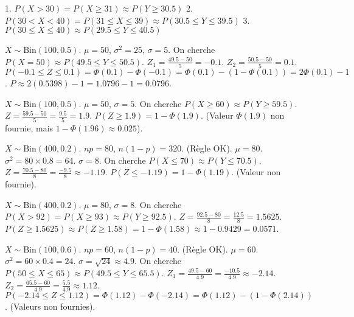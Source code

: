\begin{correctionbox}
1. $P(X > 30) = P(X \ge 31) \approx P(Y \ge 30.5)$
2. $P(30 < X < 40) = P(31 \le X \le 39) \approx P(30.5 \le Y \le 39.5)$
3. $P(30 \le X \le 40) \approx P(29.5 \le Y \le 40.5)$
\end{correctionbox}

\begin{correctionbox}[Correction Exercice 17 : Binomiale (Calcul P(X=k))]
$X \sim \text{Bin}(100, 0.5)$. $\mu = 50$, $\sigma^2 = 25$, $\sigma = 5$.
On cherche $P(X=50) \approx P(49.5 \le Y \le 50.5)$.
$Z_1 = \frac{49.5 - 50}{5} = -0.1$. $Z_2 = \frac{50.5 - 50}{5} = 0.1$.
$P(-0.1 \le Z \le 0.1) = \Phi(0.1) - \Phi(-0.1) = \Phi(0.1) - (1 - \Phi(0.1)) = 2\Phi(0.1) - 1$.
$P \approx 2(0.5398) - 1 = 1.0796 - 1 = 0.0796$.
\end{correctionbox}

\begin{correctionbox}
$X \sim \text{Bin}(100, 0.5)$. $\mu = 50$, $\sigma = 5$.
On cherche $P(X \ge 60) \approx P(Y \ge 59.5)$.
$Z = \frac{59.5 - 50}{5} = \frac{9.5}{5} = 1.9$.
$P(Z \ge 1.9) = 1 - \Phi(1.9)$. (Valeur $\Phi(1.9)$ non fournie, mais $1-\Phi(1.96) \approx 0.025$).
\end{correctionbox}

\begin{correctionbox}
$X \sim \text{Bin}(400, 0.2)$. $np = 80$, $n(1-p)=320$. (Règle OK).
$\mu = 80$. $\sigma^2 = 80 \times 0.8 = 64$. $\sigma = 8$.
On cherche $P(X \le 70) \approx P(Y \le 70.5)$.
$Z = \frac{70.5 - 80}{8} = \frac{-9.5}{8} \approx -1.19$.
$P(Z \le -1.19) = 1 - \Phi(1.19)$. (Valeur non fournie).
\end{correctionbox}

\begin{correctionbox}
$X \sim \text{Bin}(400, 0.2)$. $\mu = 80$, $\sigma = 8$.
On cherche $P(X > 92) = P(X \ge 93) \approx P(Y \ge 92.5)$.
$Z = \frac{92.5 - 80}{8} = \frac{12.5}{8} = 1.5625$.
$P(Z \ge 1.5625) \approx P(Z \ge 1.58) = 1 - \Phi(1.58) \approx 1 - 0.9429 = 0.0571$.
\end{correctionbox}

\begin{correctionbox}
$X \sim \text{Bin}(100, 0.6)$. $np = 60$, $n(1-p)=40$. (Règle OK).
$\mu = 60$. $\sigma^2 = 60 \times 0.4 = 24$. $\sigma = \sqrt{24} \approx 4.9$.
On cherche $P(50 \le X \le 65) \approx P(49.5 \le Y \le 65.5)$.
$Z_1 = \frac{49.5 - 60}{4.9} = \frac{-10.5}{4.9} \approx -2.14$.
$Z_2 = \frac{65.5 - 60}{4.9} = \frac{5.5}{4.9} \approx 1.12$.
$P(-2.14 \le Z \le 1.12) = \Phi(1.12) - \Phi(-2.14) = \Phi(1.12) - (1 - \Phi(2.14))$. (Valeurs non fournies).
\end{correctionbox}

